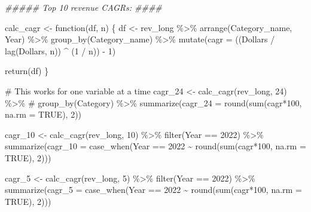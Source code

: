 \documentclass[
  letterpaper,
  DIV=11,
  numbers=noendperiod]{scrreport}
\newenvironment{Shaded}{\begin{snugshade}}{\end{snugshade}}
\newcommand{\AttributeTok}[1]{\textcolor[rgb]{0.40,0.45,0.13}{#1}}
\newcommand{\CommentTok}[1]{\textcolor[rgb]{0.37,0.37,0.37}{#1}}
\newcommand{\ConstantTok}[1]{\textcolor[rgb]{0.56,0.35,0.01}{#1}}
\newcommand{\ControlFlowTok}[1]{\textcolor[rgb]{0.00,0.23,0.31}{#1}}
\newcommand{\DecValTok}[1]{\textcolor[rgb]{0.68,0.00,0.00}{#1}}
\newcommand{\DocumentationTok}[1]{\textcolor[rgb]{0.37,0.37,0.37}{\textit{#1}}}
\newcommand{\FunctionTok}[1]{\textcolor[rgb]{0.28,0.35,0.67}{#1}}
\newcommand{\NormalTok}[1]{\textcolor[rgb]{0.00,0.23,0.31}{#1}}
\newcommand{\OtherTok}[1]{\textcolor[rgb]{0.00,0.23,0.31}{#1}}
\newcommand{\SpecialCharTok}[1]{\textcolor[rgb]{0.37,0.37,0.37}{#1}}
\begin{document}
\begin{Shaded}
\begin{Highlighting}[]
\DocumentationTok{\#\#\#\#\# Top 10 revenue CAGRs: \#\#\#\#}


\NormalTok{calc\_cagr }\OtherTok{\textless{}{-}} \ControlFlowTok{function}\NormalTok{(df, n) \{}
\NormalTok{  df }\OtherTok{\textless{}{-}}\NormalTok{ rev\_long }\SpecialCharTok{\%\textgreater{}\%}
    \FunctionTok{arrange}\NormalTok{(Category\_name, Year) }\SpecialCharTok{\%\textgreater{}\%}
    \FunctionTok{group\_by}\NormalTok{(Category\_name) }\SpecialCharTok{\%\textgreater{}\%}
    \FunctionTok{mutate}\NormalTok{(}\AttributeTok{cagr =}\NormalTok{ ((Dollars }\SpecialCharTok{/} \FunctionTok{lag}\NormalTok{(Dollars, n)) }\SpecialCharTok{\^{}}\NormalTok{ (}\DecValTok{1} \SpecialCharTok{/}\NormalTok{ n)) }\SpecialCharTok{{-}} \DecValTok{1}\NormalTok{)}

  \FunctionTok{return}\NormalTok{(df)}
\NormalTok{\}}

\CommentTok{\# This works for one variable at a time}
\NormalTok{cagr\_24 }\OtherTok{\textless{}{-}} \FunctionTok{calc\_cagr}\NormalTok{(rev\_long, }\DecValTok{24}\NormalTok{) }\SpecialCharTok{\%\textgreater{}\%} 
     \CommentTok{\# group\_by(Category) \%\textgreater{}\%}
  \FunctionTok{summarize}\NormalTok{(}\AttributeTok{cagr\_24 =} \FunctionTok{round}\NormalTok{(}\FunctionTok{sum}\NormalTok{(cagr}\SpecialCharTok{*}\DecValTok{100}\NormalTok{, }\AttributeTok{na.rm =} \ConstantTok{TRUE}\NormalTok{), }\DecValTok{2}\NormalTok{))}

\NormalTok{cagr\_10 }\OtherTok{\textless{}{-}} \FunctionTok{calc\_cagr}\NormalTok{(rev\_long, }\DecValTok{10}\NormalTok{) }\SpecialCharTok{\%\textgreater{}\%} 
  \FunctionTok{filter}\NormalTok{(Year }\SpecialCharTok{==} \DecValTok{2022}\NormalTok{) }\SpecialCharTok{\%\textgreater{}\%}
  \FunctionTok{summarize}\NormalTok{(}\AttributeTok{cagr\_10 =} \FunctionTok{case\_when}\NormalTok{(Year }\SpecialCharTok{==} \DecValTok{2022} \SpecialCharTok{\textasciitilde{}} \FunctionTok{round}\NormalTok{(}\FunctionTok{sum}\NormalTok{(cagr}\SpecialCharTok{*}\DecValTok{100}\NormalTok{, }\AttributeTok{na.rm =} \ConstantTok{TRUE}\NormalTok{), }\DecValTok{2}\NormalTok{)))}

\NormalTok{cagr\_5 }\OtherTok{\textless{}{-}} \FunctionTok{calc\_cagr}\NormalTok{(rev\_long, }\DecValTok{5}\NormalTok{) }\SpecialCharTok{\%\textgreater{}\%} 
  \FunctionTok{filter}\NormalTok{(Year }\SpecialCharTok{==} \DecValTok{2022}\NormalTok{) }\SpecialCharTok{\%\textgreater{}\%}
  \FunctionTok{summarize}\NormalTok{(}\AttributeTok{cagr\_5 =} \FunctionTok{case\_when}\NormalTok{(Year }\SpecialCharTok{==} \DecValTok{2022} \SpecialCharTok{\textasciitilde{}} \FunctionTok{round}\NormalTok{(}\FunctionTok{sum}\NormalTok{(cagr}\SpecialCharTok{*}\DecValTok{100}\NormalTok{, }\AttributeTok{na.rm =} \ConstantTok{TRUE}\NormalTok{), }\DecValTok{2}\NormalTok{)))}


\end{Highlighting}
\end{Shaded}
\end{document}
